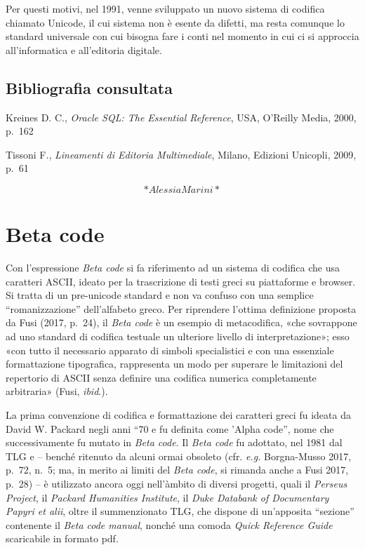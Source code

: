 \documentclass[
  b5paper,
  twoside,
  11pt,
  chapterprefix=false,
  bibliography=totocnumbered,
  parskip=0]{scrbook}
\begin{document}
Per questi motivi, nel 1991, venne sviluppato un nuovo sistema di
codifica chiamato Unicode, il cui sistema non è esente da difetti, ma
resta comunque lo standard universale con cui bisogna fare i conti nel
momento in cui ci si approccia all'informatica e all'editoria digitale.

\hypertarget{bibliografia-consultata-1}{%
\section*{Bibliografia consultata}\label{bibliografia-consultata-1}}

Kreines D. C., \emph{Oracle SQL: The Essential Reference}, USA, O'Reilly
Media, 2000, p.~162

Tissoni F., \emph{Lineamenti di Editoria Multimediale}, Milano, Edizioni
Unicopli, 2009, p.~61

\[*Alessia Marini*\]

\hypertarget{beta-code}{%
\chapter{Beta code}\label{beta-code}}

Con l'espressione \emph{Beta code} si fa riferimento ad un sistema di
codifica che usa caratteri ASCII, ideato per la trascrizione di testi
greci su piattaforme e browser. Si tratta di un pre-unicode standard e
non va confuso con una semplice \enquote{romanizzazione} dell'alfabeto greco.
Per riprendere l'ottima definizione proposta da Fusi (2017, p.~24), il
\emph{Beta code} è un esempio di metacodifica, «che sovrappone ad uno
standard di codifica testuale un ulteriore livello di interpretazione»;
esso «con tutto il necessario apparato di simboli specialistici e con
una essenziale formattazione tipografica, rappresenta un modo per
superare le limitazioni del repertorio di ASCII senza definire una
codifica numerica completamente arbitraria» (Fusi, \emph{ibid}.).~

La prima convenzione di codifica e formattazione dei caratteri greci fu
ideata da David W. Packard negli anni \enquote{70 e fu definita come 'Alpha
code}, nome che successivamente fu mutato in \emph{Beta code}. Il \emph{Beta code}
fu adottato, nel 1981 dal TLG e -- benché ritenuto da alcuni ormai
obsoleto (cfr. \emph{e.g.} Borgna-Musso 2017, p.~72, n.~5; ma, in merito ai
limiti del \emph{Beta code}, si rimanda anche a Fusi 2017, p.~28) -- è
utilizzato ancora oggi nell'àmbito di diversi progetti, quali il
\emph{Perseus Project}, il \emph{Packard Humanities Institute}, il \emph{Duke Databank
of Documentary Papyri et alii}, oltre il summenzionato TLG, che dispone
di un'apposita \enquote{sezione} contenente il \emph{Beta code manual}, nonché una
comoda \emph{Quick Reference Guide} scaricabile in formato pdf.
\end{document}
